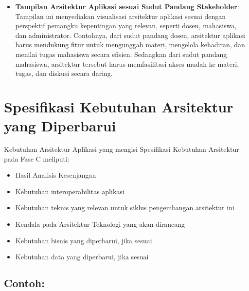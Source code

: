 \begin{itemize}
	\item \textbf{Tampilan Arsitektur Aplikasi sesuai Sudut Pandang Stakeholder}: Tampilan ini menyediakan visualisasi arsitektur aplikasi sesuai dengan perspektif pemangku kepentingan yang relevan, seperti dosen, mahasiswa, dan administrator. Contohnya, dari sudut pandang dosen, arsitektur aplikasi harus mendukung fitur untuk mengunggah materi, mengelola kehadiran, dan menilai tugas mahasiswa secara efisien. Sedangkan dari sudut pandang mahasiswa, arsitektur tersebut harus memfasilitasi akses mudah ke materi, tugas, dan diskusi secara daring.
\end{itemize}

\section{Spesifikasi Kebutuhan Arsitektur yang Diperbarui}
Kebutuhan Arsitektur Aplikasi yang mengisi Spesifikasi Kebutuhan Arsitektur pada Fase C meliputi:
\begin{itemize}
	\item Hasil Analisis Kesenjangan
	\item Kebutuhan interoperabilitas aplikasi
	\item Kebutuhan teknis yang relevan untuk siklus pengembangan arsitektur ini
	\item Kendala pada Arsitektur Teknologi yang akan dirancang
	\item Kebutuhan bisnis yang diperbarui, jika sesuai
	\item Kebutuhan data yang diperbarui, jika sesuai
\end{itemize}

\subsection*{Contoh:}

